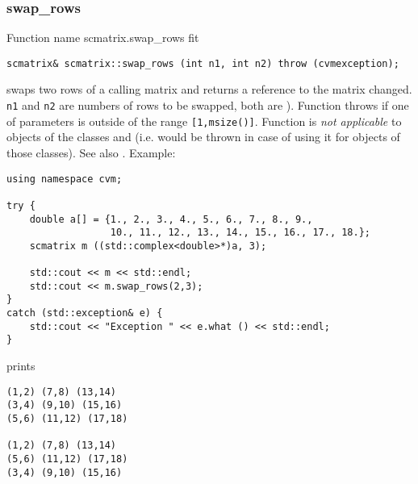 \subsubsection{swap\_rows}
Function%
\pdfdest name {scmatrix.swap_rows} fit
\begin{verbatim}
scmatrix& scmatrix::swap_rows (int n1, int n2) throw (cvmexception);
\end{verbatim}
swaps two rows of a calling matrix and returns a reference to
the matrix changed. \verb"n1" and \verb"n2" are
 numbers of rows to be swapped, 
both are \Based).
Function throws  
if one of  parameters is outside of the range
\verb"[1,msize()]".
Function is 
\emph{not applicable} to objects of the classes
 and
 (i.e.  would be thrown
in case of using it for objects of those classes).
See also .
Example:
\begin{Verbatim}
using namespace cvm;

try {
    double a[] = {1., 2., 3., 4., 5., 6., 7., 8., 9.,
                  10., 11., 12., 13., 14., 15., 16., 17., 18.};
    scmatrix m ((std::complex<double>*)a, 3);

    std::cout << m << std::endl;
    std::cout << m.swap_rows(2,3);
}
catch (std::exception& e) {
    std::cout << "Exception " << e.what () << std::endl;
}
\end{Verbatim}
prints
\begin{Verbatim}
(1,2) (7,8) (13,14)
(3,4) (9,10) (15,16)
(5,6) (11,12) (17,18)

(1,2) (7,8) (13,14)
(5,6) (11,12) (17,18)
(3,4) (9,10) (15,16)
\end{Verbatim}
\newpage


